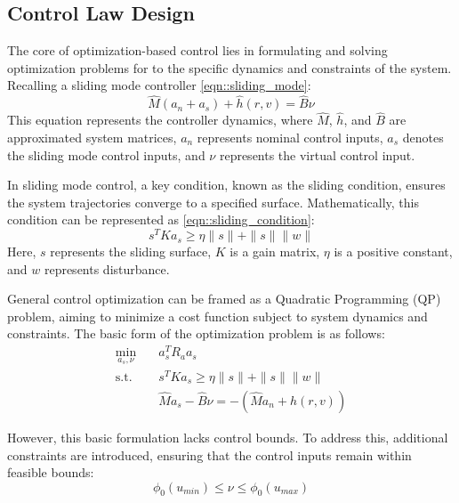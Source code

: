     \subsection{Control Law Design}

    The core of optimization-based control lies in formulating and solving optimization 
    problems for to the specific dynamics and constraints of the system. 
    Recalling a sliding mode controller \ref{eqn::sliding_mode}:
    \begin{equation*}
        \hat M(a_n + a_s)  + \hat h (r, v) = \hat B \nu
    \end{equation*}
    This equation represents the controller dynamics, where $\hat{M}$, $\hat{h}$, 
    and $\hat{B}$ are approximated system matrices, $a_n$ represents nominal control inputs, 
    $a_s$ denotes the sliding mode control inputs, and $\nu$ represents the virtual control input.

    In sliding mode control, a key condition, known as the sliding condition, 
    ensures the system trajectories converge to a specified surface. 
    Mathematically, this condition can be represented as \ref{eqn::sliding_condition}:
    \begin{equation*}
        s^TKa_s \geq \eta \|s\| + \|s\|\|w\|
    \end{equation*}
    Here, $s$ represents the sliding surface, $K$ is a gain matrix, $\eta$ is a 
    positive constant, and $w$ represents disturbance.

    General control optimization can be framed as a Quadratic Programming (QP) 
    problem, aiming to minimize a cost function subject to system dynamics 
    and constraints. The basic form of the optimization problem is as follows:
    \begin{equation}
    \begin{aligned}
    \min_{a_s, \nu} \quad & a_s^T R_a a_s \\
    \textrm{s.t.} \quad & s^TKa_s \geq \eta \|s\| + \|s\|\|w\| \\
    &\hat Ma_s - \hat B\nu = -(\hat{M}a_n + h(r, v))
    \end{aligned}
    \end{equation}

    However, this basic formulation lacks control bounds. 
    To address this, additional constraints are introduced, 
    ensuring that the control inputs remain within feasible bounds:
    \begin{equation}
    \phi_0(u_{min}) \leq \nu \leq \phi_0(u_{max})
    \end{equation}

